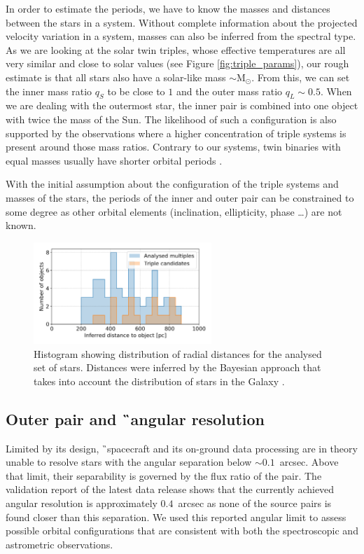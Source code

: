 In order to estimate the periods, we have to know the masses and distances between the stars in a system. Without complete information about the projected velocity variation in a system, masses can also be inferred from the spectral type. As we are looking at the solar twin triples, whose effective temperatures are all very similar and close to solar values (see Figure \ref{fig:triple_params}), our rough estimate is that all stars also have a solar-like mass $\sim$M$_{\odot}$. From this, we can set the inner mass ratio $q_S$ to be close to $1$ and the outer mass ratio $q_L \sim 0.5$. When we are dealing with the outermost star, the inner pair is combined into one object with twice the mass of the Sun. The likelihood of such a configuration is also supported by the observations \cite{2008MNRAS.389..925T} where a higher concentration of triple systems is present around those mass ratios. Contrary to our systems, twin binaries with equal masses usually have shorter orbital periods \cite{2000A&A...360..997T}. 

With the initial assumption about the configuration of the triple systems and masses of the stars, the periods of the inner and outer pair can be constrained to some degree as other orbital elements (inclination, ellipticity, phase \ldots) are not known.

\begin{figure}
	\centering
	\includegraphics[width=0.6\textwidth]{dist_pc.png}
	\caption{Histogram showing distribution of radial distances for the analysed set of stars. Distances were inferred by the Bayesian approach that takes into account the distribution of stars in the Galaxy \cite{2018AJ....156...58B}.}
	\label{fig:gaia_dist}
\end{figure}

\subsection{Outer pair and \G\ angular resolution}
\label{sec:orbits_gaia}
Limited by its design, \G\ spacecraft and its on-ground data processing are in theory unable to resolve stars with the angular separation below $\sim0.1$~arcsec. Above that limit, their separability is governed by the flux ratio of the pair. The validation report of the latest data release \cite{2018A&A...616A..17A} shows that the currently achieved angular resolution is approximately $0.4$~arcsec as none of the source pairs is found closer than this separation. We used this reported angular limit to assess possible orbital configurations that are consistent with both the spectroscopic and astrometric observations.

